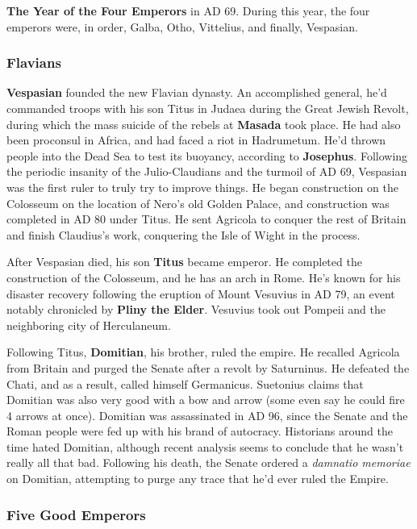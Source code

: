 \textbf{The Year of the Four Emperors} in AD 69. During this year, the four emperors were, in order,
Galba, Otho, Vittelius, and finally, Vespasian.

\subsubsection*{Flavians}

\textbf{Vespasian} founded the new Flavian dynasty.
An accomplished general, he'd commanded troops with his son Titus in Judaea during the Great Jewish Revolt,
during which the mass suicide of the rebels at \textbf{Masada} took place.
He had also been proconsul in Africa, and had faced a riot in Hadrumetum.
He'd thrown people into the Dead Sea to test its buoyancy, according to \textbf{Josephus}.
Following the periodic insanity of the Julio-Claudians and the turmoil of AD 69,
Vespasian was the first ruler to truly try to improve things.
He began construction on the Colosseum on the location of Nero's old Golden Palace,
and construction was completed in AD 80 under Titus.
He sent Agricola to conquer the rest of Britain and finish Claudius's work,
conquering the Isle of Wight in the process.

After Vespasian died, his son \textbf{Titus} became emperor.
He completed the construction of the Colosseum, and he has an arch in Rome.
He's known for his disaster recovery following the eruption of Mount Vesuvius in AD 79,
an event notably chronicled by \textbf{Pliny the Elder}.
Vesuvius took out Pompeii and the neighboring city of Herculaneum.

Following Titus, \textbf{Domitian}, his brother, ruled the empire.
He recalled Agricola from Britain and purged the Senate after a revolt by Saturninus.
He defeated the Chati, and as a result, called himself Germanicus.
Suetonius claims that Domitian was also very good with a bow and arrow
(some even say he could fire 4 arrows at once).
Domitian was assassinated in AD 96,
since the Senate and the Roman people were fed up with his brand of autocracy.
Historians around the time hated Domitian,
although recent analysis seems to conclude that he wasn't really all that bad.
Following his death, the Senate ordered a \textit{damnatio memoriae} on Domitian,
attempting to purge any trace that he'd ever ruled the Empire.

\subsubsection*{Five Good Emperors}


